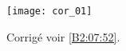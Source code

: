 
\begin{center}
\texttt{[image: cor\_01]}
\end{center}

\else 
\fi




 

\ifprof
\else
\begin{flushright}
\footnotesize{Corrigé  voir \ref{B2:07:52}.}
\end{flushright}%
\fi